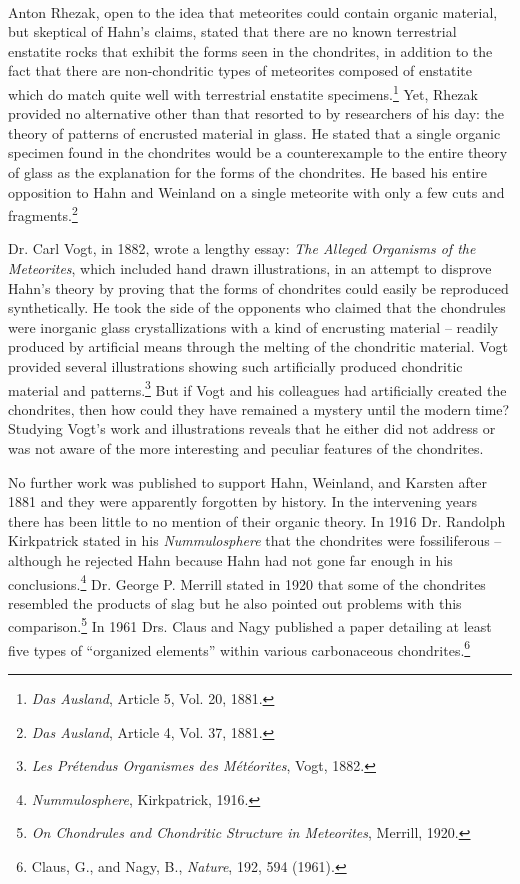 \documentclass[a4paper, 12pt, oneside]{article}
\begin{document}
\paragraph*{}
Anton Rhezak, open to the idea that meteorites could contain organic material, but skeptical of Hahn's claims, stated that there are no known terrestrial enstatite rocks that exhibit the forms seen in the chondrites, in addition to the fact that there are non-chondritic types of meteorites composed of enstatite which do match quite well with terrestrial enstatite specimens.\footnote{\emph{Das Ausland}, Article 5, Vol. 20, 1881.} Yet, Rhezak provided no alternative other than that resorted to by researchers of his day: the theory of patterns of encrusted material in glass. He stated that a single organic specimen found in the chondrites would be a counterexample to the entire theory of glass as the explanation for the forms of the chondrites. He based his entire opposition to Hahn and Weinland on a single meteorite with only a few cuts and fragments.\footnote{\emph{Das Ausland}, Article 4, Vol. 37, 1881.}

Dr. Carl Vogt, in 1882, wrote a lengthy essay: \emph{The Alleged Organisms of the Meteorites}, which included hand drawn illustrations, in an attempt to disprove Hahn's theory by proving that the forms of chondrites could easily be reproduced synthetically. He took the side of the opponents who claimed that the chondrules were inorganic glass crystallizations with a kind of encrusting material -- readily produced by artificial means through the melting of the chondritic material. Vogt provided several illustrations showing such artificially produced chondritic material and patterns.\footnote{\emph{Les Prétendus Organismes des Météorites}, Vogt, 1882.} But if Vogt and his colleagues had artificially created the chondrites, then how could they have remained a mystery until the modern time? Studying Vogt's work and illustrations reveals that he either did not address or was not aware of the more interesting and peculiar features of the chondrites.

No further work was published to support Hahn, Weinland, and Karsten after 1881 and they were apparently forgotten by history. In the intervening years there has been little to no mention of their organic theory. In 1916 Dr. Randolph Kirkpatrick stated in his \emph{Nummulosphere} that the chondrites were fossiliferous -- although he rejected Hahn because Hahn had not gone far enough in his conclusions.\footnote{\emph{Nummulosphere}, Kirkpatrick, 1916.} Dr. George P. Merrill stated in 1920 that some of the chondrites resembled the products of slag but he also pointed out problems with this comparison.\footnote{\emph{On Chondrules and Chondritic Structure in Meteorites}, Merrill, 1920.} In 1961 Drs. Claus and Nagy published a paper detailing at least five types of ``organized elements'' within various carbonaceous chondrites.\footnote{Claus, G., and Nagy, B., \emph{Nature}, 192, 594 (1961).}
\end{document}
